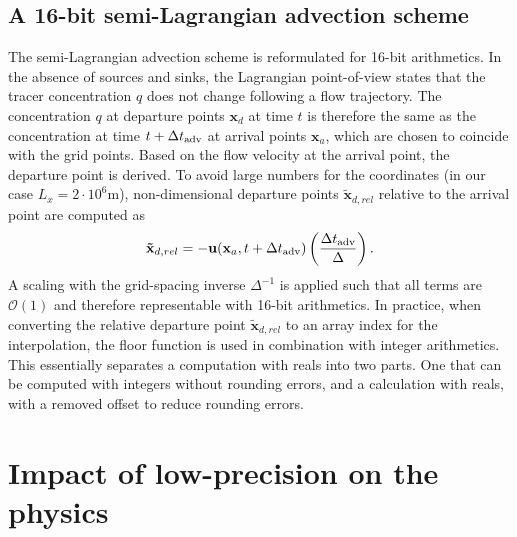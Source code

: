 \subsection{A 16-bit semi-Lagrangian advection scheme}

The semi-Lagrangian advection scheme is reformulated for 16-bit arithmetics.
In the absence of sources and sinks, the Lagrangian point-of-view states that
the tracer concentration $q$ does not change following a flow trajectory.
The concentration $q$ at departure points $\mathbf{x}_d$ at time $t$ is therefore
the same as the concentration at time $t+\Delta t_{\operatorname{adv}}$ at arrival points
$\mathbf{x}_a$, which are chosen to coincide with the grid points.
Based on the flow velocity at the arrival point, the departure point is derived.
To avoid large numbers for the coordinates (in our case $L_x = 2 \cdot 10^6$m),
non-dimensional departure points $\mathbf{\tilde{x}}_{d,rel}$ relative to the
arrival point are computed as
\begin{equation}
\mathbf{\tilde{x}}_{d,rel} = - \mathbf{u}(\mathbf{x}_a,t+\Delta t_{\operatorname{adv}})
\left( \frac{\Delta t_{\operatorname{adv}}}{\Delta} \right).
\label{eq:relcoord}
\end{equation}
A scaling with the grid-spacing inverse $\Delta^{-1}$ is applied such that all
terms are $\mathcal{O}(1)$ and therefore representable with 16-bit arithmetics.
In practice, when converting the relative departure point $\mathbf{\tilde{x}}_{d,rel}$
to an array index for the interpolation, the floor function is used in combination
with integer arithmetics. This essentially separates a computation with reals
into two parts. One that can be computed with integers without rounding errors,
and a calculation with reals, with a removed offset to reduce rounding errors.

\section{Impact of low-precision on the physics}

